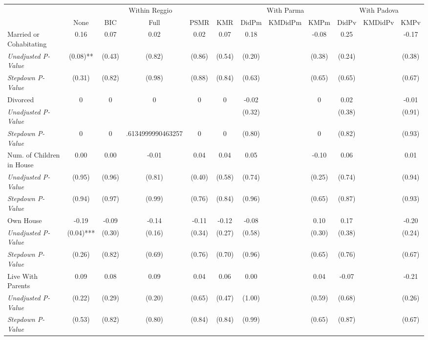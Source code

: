 \begin{tabular}{l c c c c c c c c c c c}
\toprule
& \multicolumn{5}{c}{Within Reggio} & \multicolumn{3}{c}{With Parma} & \multicolumn{3}{c}{With Padova} \\\cmidrule(lr){2-6} \cmidrule(lr){7-9} \cmidrule(lr){10-12}
 & None & BIC & Full & PSMR & KMR & DidPm & KMDidPm & KMPm & DidPv & KMDidPv & KMPv \\
\midrule
Married or Cohabitating & 0.16 & 0.07 & 0.02 & 0.02 & 0.07 & 0.18 & & -0.08 & 0.25 & & -0.17 \\
\quad \textit{Unadjusted P-Value} & (0.08)** & (0.43) & (0.82) & (0.86) & (0.54) & (0.20) & & (0.38) & (0.24) & & (0.38) \\
\quad \textit{Stepdown P-Value} & (0.31) & (0.82) & (0.98) & (0.88) & (0.84) & (0.63) & & (0.65) & (0.65) & & (0.67) \\
Divorced & 0 & 0 & 0 & 0 & 0 & -0.02 & & 0 & 0.02 & & -0.01 \\
\quad \textit{Unadjusted P-Value} & & & & & & (0.32) & & & (0.38) & & (0.91) \\
\quad \textit{Stepdown P-Value} & 0 & 0 & .6134999990463257 & 0 & 0 & (0.80) & & 0 & (0.82) & & (0.93) \\
Num. of Children in House & 0.00 & 0.00 & -0.01 & 0.04 & 0.04 & 0.05 & & -0.10 & 0.06 & & 0.01 \\
\quad \textit{Unadjusted P-Value} & (0.95) & (0.96) & (0.81) & (0.40) & (0.58) & (0.74) & & (0.25) & (0.74) & & (0.94) \\
\quad \textit{Stepdown P-Value} & (0.94) & (0.97) & (0.99) & (0.76) & (0.84) & (0.96) & & (0.65) & (0.87) & & (0.93) \\
Own House & -0.19 & -0.09 & -0.14 & -0.11 & -0.12 & -0.08 & & 0.10 & 0.17 & & -0.20 \\
\quad \textit{Unadjusted P-Value} & (0.04)*** & (0.30) & (0.16) & (0.34) & (0.27) & (0.58) & & (0.30) & (0.38) & & (0.24) \\
\quad \textit{Stepdown P-Value} & (0.26) & (0.82) & (0.69) & (0.76) & (0.70) & (0.96) & & (0.65) & (0.76) & & (0.67) \\
Live With Parents & 0.09 & 0.08 & 0.09 & 0.04 & 0.06 & 0.00 & & 0.04 & -0.07 & & -0.21 \\
\quad \textit{Unadjusted P-Value} & (0.22) & (0.29) & (0.20) & (0.65) & (0.47) & (1.00) & & (0.59) & (0.68) & & (0.26) \\
\quad \textit{Stepdown P-Value} & (0.53) & (0.82) & (0.80) & (0.84) & (0.84) & (0.99) & & (0.65) & (0.87) & & (0.67) \\
\bottomrule
\end{tabular}
